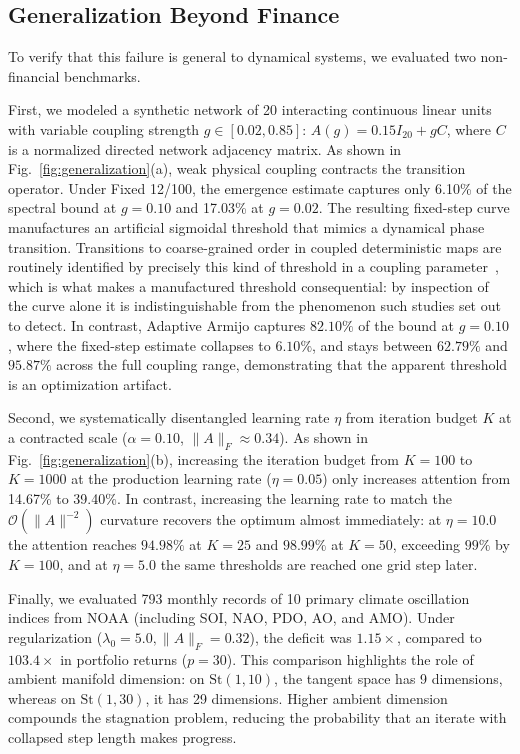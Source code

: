 \documentclass[preprint,12pt]{elsarticle}
\begin{document}
\subsection{Generalization Beyond Finance}

To verify that this failure is general to dynamical systems, we evaluated two non-financial benchmarks.

First, we modeled a synthetic network of 20 interacting continuous linear units with variable coupling strength $g \in [0.02, 0.85]$: $A(g) = 0.15 I_{20} + g C$, where $C$ is a normalized directed network adjacency matrix. As shown in Fig.~\ref{fig:generalization}(a), weak physical coupling contracts the transition operator. Under Fixed 12/100, the emergence estimate captures only 6.10\% of the spectral bound at $g = 0.10$ and 17.03\% at $g = 0.02$. The resulting fixed-step curve manufactures an artificial sigmoidal threshold that mimics a dynamical phase transition. Transitions to coarse-grained order in coupled deterministic maps are routinely identified by precisely this kind of threshold in a coupling parameter~\cite{Rajvaidya2020}, which is what makes a manufactured threshold consequential: by inspection of the curve alone it is indistinguishable from the phenomenon such studies set out to detect. In contrast, Adaptive Armijo captures $82.10\%$ of the bound at $g = 0.10$, where the fixed-step estimate collapses to $6.10\%$, and stays between $62.79\%$ and $95.87\%$ across the full coupling range, demonstrating that the apparent threshold is an optimization artifact.

Second, we systematically disentangled learning rate $\eta$ from iteration budget $K$ at a contracted scale ($\alpha = 0.10$, $\|A\|_F \approx 0.34$). As shown in Fig.~\ref{fig:generalization}(b), increasing the iteration budget from $K=100$ to $K=1000$ at the production learning rate ($\eta = 0.05$) only increases attention from 14.67\% to 39.40\%. In contrast, increasing the learning rate to match the $\mathcal{O}(\|A\|^{-2})$ curvature recovers the optimum almost immediately: at $\eta = 10.0$ the attention reaches $94.98\%$ at $K = 25$ and $98.99\%$ at $K = 50$, exceeding $99\%$ by $K = 100$, and at $\eta = 5.0$ the same thresholds are reached one grid step later.

Finally, we evaluated 793 monthly records of 10 primary climate oscillation indices from NOAA (including SOI, NAO, PDO, AO, and AMO). Under regularization ($\lambda_0 = 5.0, \|A\|_F = 0.32$), the deficit was $1.15\times$, compared to $103.4\times$ in portfolio returns ($p=30$). This comparison highlights the role of ambient manifold dimension: on $\mathrm{St}(1, 10)$, the tangent space has 9 dimensions, whereas on $\mathrm{St}(1, 30)$, it has 29 dimensions. Higher ambient dimension compounds the stagnation problem, reducing the probability that an iterate with collapsed step length makes progress.
\end{document}
